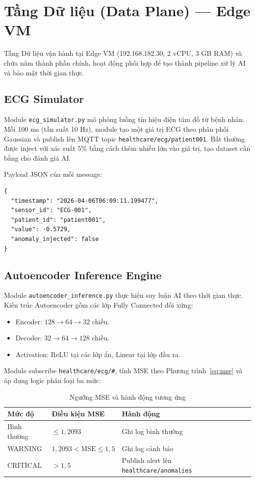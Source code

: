 \section{Tầng Dữ liệu (Data Plane) — Edge VM}

Tầng Dữ liệu vận hành tại Edge VM (192.168.182.30, 2 vCPU, 3 GB RAM) và chứa năm thành phần chính, hoạt động phối hợp để tạo thành pipeline xử lý AI và bảo mật thời gian thực.

\subsection{ECG Simulator}

Module \texttt{ecg\_simulator.py} mô phỏng luồng tín hiệu điện tâm đồ từ bệnh nhân. Mỗi 100 ms (tần suất 10 Hz), module tạo một giá trị ECG theo phân phối Gaussian và publish lên MQTT topic \texttt{healthcare/ecg/patient001}. Bất thường được inject với xác suất 5\% bằng cách thêm nhiễu lớn vào giá trị, tạo dataset cân bằng cho đánh giá AI.

Payload JSON của mỗi message:
\begin{lstlisting}[caption={Cấu trúc MQTT message từ ECG Simulator}]
{
  "timestamp": "2026-04-06T06:09:11.199477",
  "sensor_id": "ECG-001",
  "patient_id": "patient001",
  "value": -0.5729,
  "anomaly_injected": false
}
\end{lstlisting}

\subsection{Autoencoder Inference Engine}

Module \texttt{autoencoder\_inference.py} thực hiện suy luận AI theo thời gian thực. Kiến trúc Autoencoder gồm các lớp Fully Connected đối xứng:
\begin{itemize}
    \item Encoder: $128 \to 64 \to 32$ chiều.
    \item Decoder: $32 \to 64 \to 128$ chiều.
    \item Activation: ReLU tại các lớp ẩn, Linear tại lớp đầu ra.
\end{itemize}

Module subscribe \texttt{healthcare/ecg/\#}, tính MSE theo Phương trình~\ref{eq:mse} và áp dụng logic phân loại ba mức:

\begin{table}[htbp]
\caption{Ngưỡng MSE và hành động tương ứng}
\label{tab:mse_logic}
\centering
\begin{tabular}{llll}
\toprule
\textbf{Mức độ} & \textbf{Điều kiện MSE} & \textbf{Hành động} \\
\midrule
Bình thường & $\leq 1{,}2093$ & Ghi log bình thường \\
WARNING     & $1{,}2093 < \text{MSE} \leq 1{,}5$ & Ghi log cảnh báo \\
CRITICAL    & $> 1{,}5$ & Publish alert lên \texttt{healthcare/anomalies} \\
\bottomrule
\end{tabular}
\end{table}

